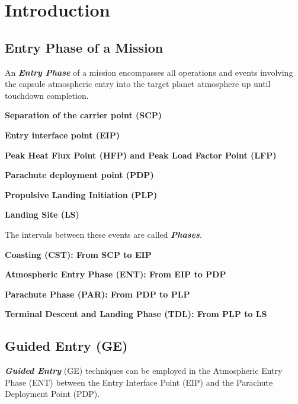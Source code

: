 \chapter{Introduction}

    \section{Entry Phase of a Mission}

        An \textbf{\textit{Entry Phase}} of a mission encompasses all operations and
        events involving the capsule atmospheric entry into the target planet
        atmosphere up until touchdown completion.

        \textbf{Separation of the carrier point (SCP)}

        \textbf{Entry interface point (EIP)}

        \textbf{Peak Heat Flux Point (HFP) and Peak Load Factor Point (LFP)}

        \textbf{Parachute deployment point (PDP)}

        \textbf{Propulsive Landing Initiation (PLP)}

        \textbf{Landing Site (LS)}

        The intervals between these events are called \textbf{\textit{Phases}}.

        \textbf{Coasting (CST): From SCP to EIP}

        \textbf{Atmospheric Entry Phase (ENT): From EIP to PDP}

        \textbf{Parachute Phase (PAR): From PDP to PLP}

        \textbf{Terminal Descent and Landing Phase (TDL): From PLP to LS}


    \section{Guided Entry (GE)}

        \textbf{\textit{Guided Entry}} (GE) techniques can be employed in the Atmospheric Entry Phase (ENT)
        between the Entry Interface Point (EIP) and the Parachute Deployment Point (PDP).

